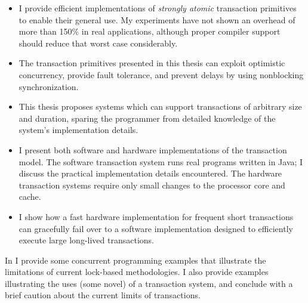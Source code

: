 \begin{itemize}
\item I provide efficient implementations of
\textit{strongly atomic} transaction primitives to enable their general use.
My experiments have
not shown an overhead of more than 150\% in real applications,
although proper compiler support should reduce that worst case
considerably.%

\item The transaction
primitives presented in this thesis can exploit optimistic
concurrency, provide fault tolerance, and prevent delays by using
nonblocking synchronization.

\item This thesis proposes systems which can support transactions of
arbitrary size and duration, sparing the programmer from detailed
knowledge of the system's implementation details.

\item I present both software and hardware implementations of the
transaction model.
The software transaction system runs real programs written in
Java; I discuss the practical implementation details encountered.
The hardware transaction systems require only small changes to the
processor core and cache.

\item I show how a fast hardware implementation for
frequent short transactions can gracefully fail over to a software
implementation designed to efficiently execute large long-lived
transactions.
\end{itemize}

In  I provide some concurrent programming
examples that illustrate the limitations of current lock-based
methodologies.  I also provide examples illustrating the uses
(some novel) of a transaction system, and conclude with a brief
caution about the current limits of transactions.

